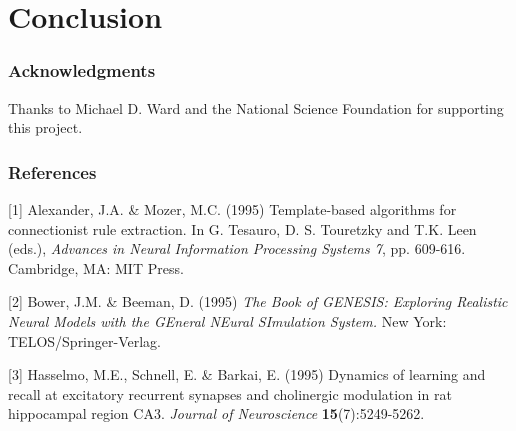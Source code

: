\documentclass[12pt,letterpaper]{article} %
\begin{document}
\section{Conclusion}











\subsubsection*{Acknowledgments}

Thanks to Michael D. Ward and the National Science Foundation for supporting this project.

\subsubsection*{References}


\small{
[1] Alexander, J.A. \& Mozer, M.C. (1995) Template-based algorithms
for connectionist rule extraction. In G. Tesauro, D. S. Touretzky
and T.K. Leen (eds.), {\it Advances in Neural Information Processing
Systems 7}, pp. 609-616. Cambridge, MA: MIT Press.

[2] Bower, J.M. \& Beeman, D. (1995) {\it The Book of GENESIS: Exploring
Realistic Neural Models with the GEneral NEural SImulation System.}
New York: TELOS/Springer-Verlag.

[3] Hasselmo, M.E., Schnell, E. \& Barkai, E. (1995) Dynamics of learning
and recall at excitatory recurrent synapses and cholinergic modulation
in rat hippocampal region CA3. {\it Journal of Neuroscience}
{\bf 15}(7):5249-5262.
}
\end{document}
